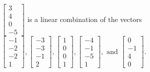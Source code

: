 \begin{exercise}
\begin{exerciseStatement}
  \end{exerciseStatement}
  \begin{exerciseAnswer}
   \(\left[\begin{array}{c}
3 \\
4 \\
0 \\
-5
\end{array}\right]\) 
  	 is  
	a linear combination of the vectors \(\left[\begin{array}{c}
-1 \\
-2 \\
-2 \\
1
\end{array}\right] , \left[\begin{array}{c}
-3 \\
-3 \\
-1 \\
2
\end{array}\right] , \left[\begin{array}{c}
1 \\
0 \\
0 \\
1
\end{array}\right] , \left[\begin{array}{c}
-4 \\
-1 \\
-5 \\
1
\end{array}\right] , \text{ and } \left[\begin{array}{c}
0 \\
-1 \\
4 \\
0
\end{array}\right]\).

	
  


  \end{exerciseAnswer}
\end{exercise}